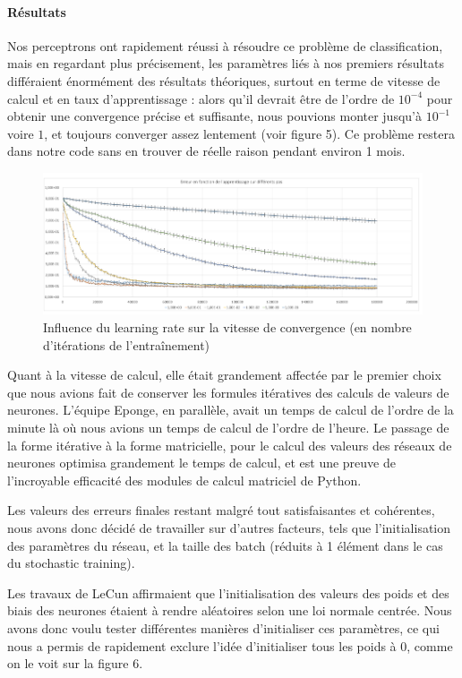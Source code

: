\documentclass[
    10pt,
    a4paper,
    oneside,
    headinclude,footinclude,
    BCOR=5mm,
    captions=tableabove
]{scrartcl}
\begin{document}
\paragraph{Résultats}
Nos perceptrons ont rapidement réussi à résoudre ce problème de classification, mais en regardant plus précisement, les paramètres liés à nos premiers résultats différaient énormément des résultats théoriques, surtout en terme de vitesse de calcul et en taux d'apprentissage : alors qu'il devrait être de l'ordre de $10^{-4}$ pour obtenir une convergence précise et suffisante, nous pouvions monter jusqu'à $10^{-1}$ voire $1$, et toujours converger assez lentement (voir figure 5). Ce problème restera dans notre code sans en trouver de réelle raison pendant environ 1 mois.

\begin{figure}[h!]
\includegraphics[width=\linewidth]{errorRate.png}
\centering
\caption{Influence du learning rate sur la vitesse de convergence (en nombre d'itérations de l'entraînement) }
\label{fig:errorRate.png}
\end{figure}

Quant à la vitesse de calcul, elle était grandement affectée par le premier choix que nous avions fait de conserver les formules itératives des calculs de valeurs de neurones. L'équipe Eponge, en parallèle, avait un temps de calcul de l'ordre de la minute là où nous avions un temps de calcul de l'ordre de l'heure. Le passage de la forme itérative à la forme matricielle, pour le calcul des valeurs des réseaux de neurones optimisa grandement le temps de calcul, et est une preuve de l'incroyable efficacité des modules de calcul matriciel de Python. 

Les valeurs des erreurs finales restant malgré tout satisfaisantes et cohérentes, nous avons donc décidé de travailler sur d'autres facteurs, tels que l'initialisation des paramètres du réseau, et la taille des batch (réduits à 1 élément dans le cas du stochastic training).

Les travaux de LeCun affirmaient que l'initialisation des valeurs des poids et des biais des neurones étaient à rendre aléatoires selon une loi normale centrée. Nous avons donc voulu tester différentes manières d'initialiser ces paramètres, ce qui nous a permis de rapidement exclure l'idée d'initialiser tous les poids à $0$, comme on le voit sur la figure 6. 
\end{document}
